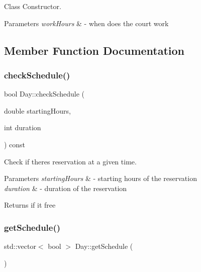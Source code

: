 Class Constructor. 


\begin{DoxyParams}{Parameters}
{\em work\+Hours} & -\/ when does the court work \\
\hline
\end{DoxyParams}


\subsection{Member Function Documentation}
\mbox{\label{class_day_ae8354b4a88cd98f5513ea6bc5dfb017e}} 
\subsubsection{\texorpdfstring{check\+Schedule()}{checkSchedule()}}
{\footnotesize\ttfamily bool Day\+::check\+Schedule (\begin{DoxyParamCaption}\item[{double}]{starting\+Hours,  }\item[{int}]{duration }\end{DoxyParamCaption}) const}



Check if there\textquotesingle{}s reservation at a given time. 


\begin{DoxyParams}{Parameters}
{\em starting\+Hours} & -\/ starting hours of the reservation \\
\hline
{\em duration} & -\/ duration of the reservation \\
\hline
\end{DoxyParams}
\begin{DoxyReturn}{Returns}
if it free 
\end{DoxyReturn}
\mbox{\label{class_day_a89096a2d290b712108feb7fe3bf7da51}} 
\subsubsection{\texorpdfstring{get\+Schedule()}{getSchedule()}}
{\footnotesize\ttfamily std\+::vector$<$ bool $>$ Day\+::get\+Schedule (\begin{DoxyParamCaption}{ }\end{DoxyParamCaption})}



